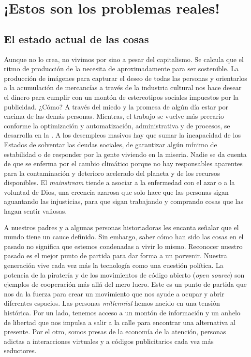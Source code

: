 \chapter{¡Estos son los problemas reales!}
\label{sec:probreals}

\section{El estado actual de las cosas}
\label{sec:stateart}

Aunque  no lo crea, no vivimos por sino a pesar del capitalismo. Se calcula que el ritmo de producción de la  necesita de aproximadamente  para ser sostenible.\addref{} La producción de imágenes para capturar el deseo de todas las personas y orientarlos a la acumulación de mercancías a través de la industria cultural nos hace desear el dinero para cumplir con un montón de estereotipos sociales impuestos por la publicidad. ¿Cómo? A través del miedo y la promesa de algún día estar por encima de las demás personas. Mientras, el trabajo se vuelve más precario conforme la optimización y automatización, administrativa y de procesos, se desarrolla en la . A los desempleos masivos hay que sumar la incapacidad de los Estados de solventar las deudas sociales, de garantizar algún mínimo de estabilidad o de responder por la gente viviendo en la miseria. Nadie se da cuenta de que se enferma por el cambio climático porque no hay responsables aparentes para la contaminación y deterioro acelerado del planeta y de los recursos disponibles. El \emph{mainstream} tiende a asociar a la enfermedad con el azar o a la voluntad de Dios, una creencia azarosa que solo hace que las personas sigan aguantando las injusticias, para que sigan trabajando y comprando cosas que las hagan sentir valiosas.

A nuestros padres y a algunas personas historiadoras les encanta señalar que el mundo tiene un cauce definido. Sin embargo, saber cómo han sido las cosas en el pasado no significa que estemos condenadas a vivir lo mismo. Reconocer nuestro pasado es el mejor punto de partida para dar forma a un porvenir. Nuestra generación vive cada vez más la tecnología como una cuestión política. La potencia de la piratería y de los movimientos de código abierto (\emph{open source}) son ejemplos de cooperación más allá del mero lucro. Este es un punto de partida que nos da la fuerza para crear un movimiento que nos ayude a ocupar y abrir diferentes espacios. Las personas \emph{millennial} hemos nacido en una tensión histórica. Por un lado, tenemos acceso a un montón de información y un anhelo de libertad que nos impulsa a salir a la calle para encontrar una alternativa al presente. Por el otro, somos presas de la economía de la atención, personas adictas a interacciones virtuales y a códigos publicitarios cada vez más seductores.

